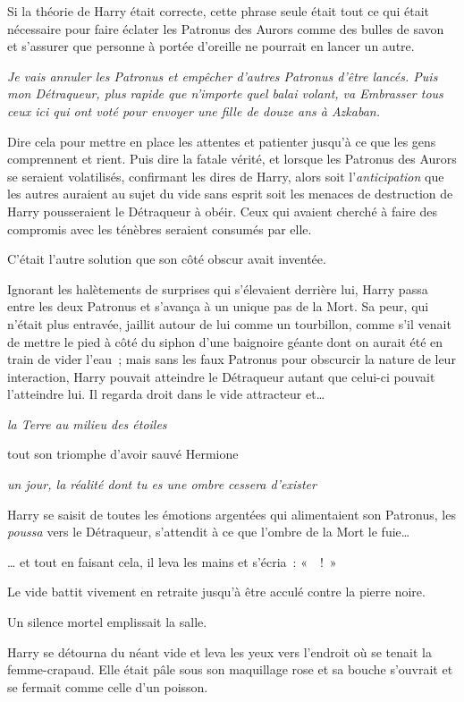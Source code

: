 Si la théorie de Harry était correcte, cette phrase seule était tout ce qui était nécessaire pour faire éclater les Patronus des Aurors comme des bulles de savon et s'assurer que personne à portée d'oreille ne pourrait en lancer un autre.

\emph{Je vais annuler les Patronus et empêcher d'autres Patronus d'être lancés.
Puis mon Détraqueur, plus rapide que n'importe quel balai volant, va Embrasser tous ceux ici qui ont voté pour envoyer une fille de douze ans à Azkaban.}

Dire cela pour mettre en place les attentes et patienter jusqu'à ce que les gens comprennent et rient.
Puis dire la fatale vérité, et lorsque les Patronus des Aurors se seraient volatilisés, confirmant les dires de Harry, alors soit l'\emph{anticipation} que les autres auraient au sujet du vide sans esprit soit les menaces de destruction de Harry pousseraient le Détraqueur à obéir.
Ceux qui avaient cherché à faire des compromis avec les ténèbres seraient consumés par elle.

C'était l'autre solution que son côté obscur avait inventée.

Ignorant les halètements de surprises qui s'élevaient derrière lui, Harry passa entre les deux Patronus et s'avança à un unique pas de la Mort.
Sa peur, qui n'était plus entravée, jaillit autour de lui comme un tourbillon, comme s'il venait de mettre le pied à côté du siphon d'une baignoire géante dont on aurait été en train de vider l'eau~; mais sans les faux Patronus pour obscurcir la nature de leur interaction, Harry pouvait atteindre le Détraqueur autant que celui-ci pouvait l'atteindre lui.
Il regarda droit dans le vide attracteur et…

\emph{la Terre au milieu des étoiles}

tout son triomphe d'avoir sauvé Hermione

\emph{un jour, la réalité dont tu es une ombre cessera d'exister}

Harry se saisit de toutes les émotions argentées qui alimentaient son Patronus, les \emph{poussa} vers le Détraqueur, s'attendit à ce que l'ombre de la Mort le fuie…

… et tout en faisant cela, il leva les mains et s'écria~: «~~!~»

Le vide battit vivement en retraite jusqu'à être acculé contre la pierre noire.

Un silence mortel emplissait la salle.

Harry se détourna du néant vide et leva les yeux vers l'endroit où se tenait la femme-crapaud.
Elle était pâle sous son maquillage rose et sa bouche s'ouvrait et se fermait comme celle d'un poisson.

